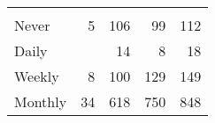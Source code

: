 \documentclass{article}
\begin{document}
\begin{tabular}{lllll}
  \multicolumn{1}{r}{} \\
\multicolumn{1}{l}{\hspace{5em}Never} &
  \multicolumn{1}{|r}{5} &
  \multicolumn{1}{r}{106} &
  \multicolumn{1}{r}{99} &
  \multicolumn{1}{r}{112} \\
\multicolumn{1}{l}{\hspace{5em}Daily} &
  \multicolumn{1}{|r}{} &
  \multicolumn{1}{r}{14} &
  \multicolumn{1}{r}{8} &
  \multicolumn{1}{r}{18} \\
\multicolumn{1}{l}{\hspace{5em}Weekly} &
  \multicolumn{1}{|r}{8} &
  \multicolumn{1}{r}{100} &
  \multicolumn{1}{r}{129} &
  \multicolumn{1}{r}{149} \\
\multicolumn{1}{l}{\hspace{5em}Monthly} &
  \multicolumn{1}{|r}{34} &
  \multicolumn{1}{r}{618} &
  \multicolumn{1}{r}{750} &
  \multicolumn{1}{r}{848} \\
\cline{1-5}
\end{tabular}
\end{document}
